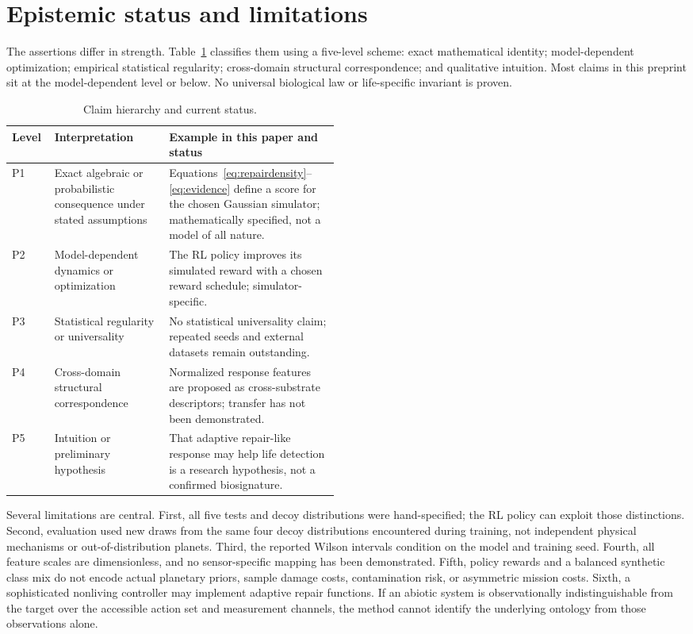 \documentclass[11pt]{article}
\begin{document}
\section{Epistemic status and limitations}
The assertions differ in strength. Table~\ref{tab:epistemic} classifies them using a five-level scheme: exact mathematical identity; model-dependent optimization; empirical statistical regularity; cross-domain structural correspondence; and qualitative intuition. Most claims in this preprint sit at the model-dependent level or below. No universal biological law or life-specific invariant is proven.

\begin{table}[htbp]
\centering\small
\caption{Claim hierarchy and current status.}
\label{tab:epistemic}
\begin{tabularx}{\linewidth}{p{0.13\linewidth}p{0.35\linewidth}X}
\toprule
Level & Interpretation & Example in this paper and status \\
\midrule
P1 & Exact algebraic or probabilistic consequence under stated assumptions & Equations~\ref{eq:repairdensity}--\ref{eq:evidence} define a score for the chosen Gaussian simulator; mathematically specified, not a model of all nature. \\
P2 & Model-dependent dynamics or optimization & The RL policy improves its simulated reward with a chosen reward schedule; simulator-specific. \\
P3 & Statistical regularity or universality & No statistical universality claim; repeated seeds and external datasets remain outstanding. \\
P4 & Cross-domain structural correspondence & Normalized response features are proposed as cross-substrate descriptors; transfer has not been demonstrated. \\
P5 & Intuition or preliminary hypothesis & That adaptive repair-like response may help life detection is a research hypothesis, not a confirmed biosignature. \\
\bottomrule
\end{tabularx}
\end{table}

Several limitations are central. First, all five tests and decoy distributions were hand-specified; the RL policy can exploit those distinctions. Second, evaluation used new draws from the same four decoy distributions encountered during training, not independent physical mechanisms or out-of-distribution planets. Third, the reported Wilson intervals condition on the model and training seed. Fourth, all feature scales are dimensionless, and no sensor-specific mapping has been demonstrated. Fifth, policy rewards and a balanced synthetic class mix do not encode actual planetary priors, sample damage costs, contamination risk, or asymmetric mission costs. Sixth, a sophisticated nonliving controller may implement adaptive repair functions. If an abiotic system is observationally indistinguishable from the target over the accessible action set and measurement channels, the method cannot identify the underlying ontology from those observations alone.
\end{document}
